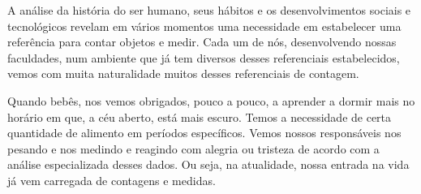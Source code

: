 \mainmatter

\label{\detokenize{NO103::doc}}\label{\detokenize{NO103:unidades-de-medidas-e-ordem-de-grandeza}}

\label{\detokenize{NO103-0:explorando-qual-e-a-medida}}\label{\detokenize{NO103-0::doc}}


A análise da história do ser humano, seus hábitos e os desenvolvimentos sociais e tecnológicos revelam em vários momentos uma necessidade em estabelecer uma referência para contar objetos e medir. Cada um de nós, desenvolvendo nossas faculdades, num ambiente que já tem diversos desses referenciais estabelecidos, vemos com muita naturalidade muitos desses referenciais de contagem.

Quando bebês, nos vemos obrigados, pouco a pouco, a aprender a dormir mais no horário em que, a céu aberto, está mais escuro. Temos a necessidade de certa quantidade de alimento em períodos específicos. Vemos nossos responsáveis nos pesando e nos medindo e reagindo com alegria ou tristeza de acordo com a análise especializada desses dados. Ou seja, na atualidade, nossa entrada na vida já vem carregada de contagens e medidas.

